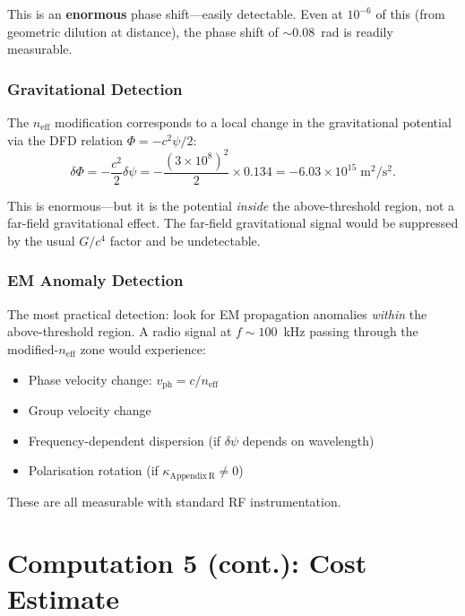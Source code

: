 \documentclass[11pt,a4paper]{article}
\begin{document}
This is an \textbf{enormous} phase shift---easily detectable. Even at $10^{-6}$ of this
(from geometric dilution at distance), the phase shift of $\sim 0.08$~rad is readily
measurable.

\subsubsection{Gravitational Detection}

The $n_{\mathrm{eff}}$ modification corresponds to a local change in the gravitational
potential via the DFD relation $\Phi = -c^2\psi/2$:
\begin{equation}
\delta\Phi = -\frac{c^2}{2}\delta\psi = -\frac{(3 \times 10^8)^2}{2} \times 0.134
= -6.03 \times 10^{15}\;\mathrm{m^2/s^2}.
\end{equation}

This is enormous---but it is the potential \emph{inside} the above-threshold region,
not a far-field gravitational effect. The far-field gravitational signal would be
suppressed by the usual $G/c^4$ factor and be undetectable.

\subsubsection{EM Anomaly Detection}

The most practical detection: look for EM propagation anomalies \emph{within}
the above-threshold region. A radio signal at $f \sim 100$~kHz passing through
the modified-$n_{\mathrm{eff}}$ zone would experience:
\begin{itemize}
\item Phase velocity change: $v_{\mathrm{ph}} = c/n_{\mathrm{eff}}$
\item Group velocity change
\item Frequency-dependent dispersion (if $\delta\psi$ depends on wavelength)
\item Polarisation rotation (if $\kappa_{\mathrm{Appendix\,R}} \neq 0$)
\end{itemize}

These are all measurable with standard RF instrumentation.

\section{Computation 5 (cont.): Cost Estimate}\label{sec:cost}
\end{document}
